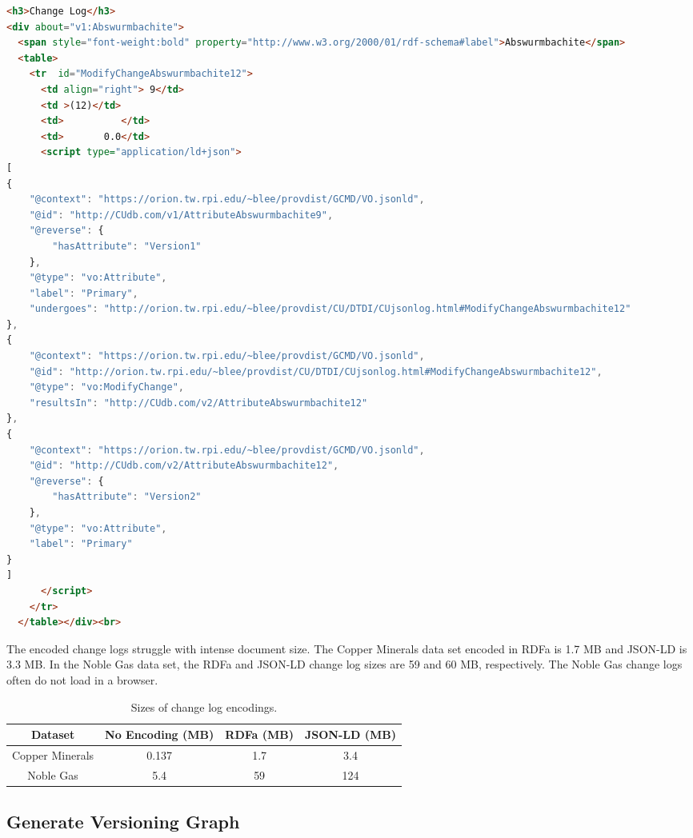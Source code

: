 \begin{lstlisting}[language=HTML, caption=Abswurmbachite JSON-LD, label=json_list]
<h3>Change Log</h3>
<div about="v1:Abswurmbachite">
  <span style="font-weight:bold" property="http://www.w3.org/2000/01/rdf-schema#label">Abswurmbachite</span>
  <table>
    <tr  id="ModifyChangeAbswurmbachite12">
      <td align="right"> 9</td>
      <td >(12)</td>
      <td>          </td>
      <td>       0.0</td>
      <script type="application/ld+json">
[
{
	"@context": "https://orion.tw.rpi.edu/~blee/provdist/GCMD/VO.jsonld", 
	"@id": "http://CUdb.com/v1/AttributeAbswurmbachite9", 
	"@reverse": {
		"hasAttribute": "Version1"
	}, 
	"@type": "vo:Attribute", 
	"label": "Primary", 
	"undergoes": "http://orion.tw.rpi.edu/~blee/provdist/CU/DTDI/CUjsonlog.html#ModifyChangeAbswurmbachite12"
}, 
{
	"@context": "https://orion.tw.rpi.edu/~blee/provdist/GCMD/VO.jsonld", 
	"@id": "http://orion.tw.rpi.edu/~blee/provdist/CU/DTDI/CUjsonlog.html#ModifyChangeAbswurmbachite12", 
	"@type": "vo:ModifyChange", 
	"resultsIn": "http://CUdb.com/v2/AttributeAbswurmbachite12"
}, 
{
	"@context": "https://orion.tw.rpi.edu/~blee/provdist/GCMD/VO.jsonld", 
	"@id": "http://CUdb.com/v2/AttributeAbswurmbachite12", 
	"@reverse": {
		"hasAttribute": "Version2"
	}, 
	"@type": "vo:Attribute", 
	"label": "Primary"
}
]
      </script>
    </tr>
  </table></div><br>
\end{lstlisting}

The encoded change logs struggle with intense document size.
The Copper Minerals data set encoded in RDFa is 1.7 MB and JSON-LD is 3.3 MB.
In the Noble Gas data set, the RDFa and JSON-LD change log sizes are 59 and 60 MB, respectively.
The Noble Gas change logs often do not load in a browser.

\begin{table}[b]
	\caption{Sizes of change log encodings.}
	\label{changelog_table}
	\centering
	\begin{tabular}{|c|c|c|c|}
		\hline
		Dataset & No Encoding (MB) & RDFa (MB) & JSON-LD (MB) \\
		\hline
		Copper Minerals & 0.137 & 1.7 & 3.4 \\
		Noble Gas & 5.4 & 59 & 124 \\
		\hline
	\end{tabular}
\end{table}

\subsection{Generate Versioning Graph}

